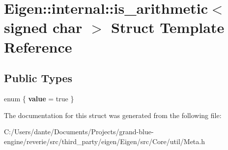 \hypertarget{struct_eigen_1_1internal_1_1is__arithmetic_3_01signed_01char_01_4}{}\section{Eigen\+::internal\+::is\+\_\+arithmetic$<$ signed char $>$ Struct Template Reference}
\label{struct_eigen_1_1internal_1_1is__arithmetic_3_01signed_01char_01_4}
\subsection*{Public Types}
\begin{DoxyCompactItemize}
\item 
\mbox{\label{struct_eigen_1_1internal_1_1is__arithmetic_3_01signed_01char_01_4_a0e5ff8fdc0dd93674ccdbe5d8dc67d5b}} 
enum \{ {\bfseries value} = true
 \}
\end{DoxyCompactItemize}


The documentation for this struct was generated from the following file\+:\begin{DoxyCompactItemize}
\item 
C\+:/\+Users/dante/\+Documents/\+Projects/grand-\/blue-\/engine/reverie/src/third\+\_\+party/eigen/\+Eigen/src/\+Core/util/Meta.\+h\end{DoxyCompactItemize}
